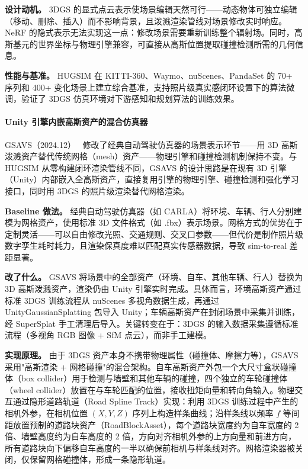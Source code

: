 \textbf{设计动机。} 3DGS 的显式点云表示使场景编辑天然可行——动态物体可独立编辑（移动、删除、插入）而不影响背景，且泼溅渲染管线对场景修改实时响应。NeRF 的隐式表示无法实现这一点：修改场景需要重新训练整个辐射场。同时，高斯基元的世界坐标与物理引擎兼容，可直接从高斯位置提取碰撞检测所需的几何信息。

\textbf{性能与基准。} HUGSIM 在 KITTI-360、Waymo、nuScenes、PandaSet 的 70+ 序列和 400+ 变化场景上建立综合基准，支持照片级真实感闭环设置下的算法微调，验证了 3DGS 仿真环境对下游感知和规划算法的训练效果。

\paragraph{Unity 引擎内嵌高斯资产的混合仿真器}

GSAVS（2024.12）~\cite{2412_18816} 修改了经典自动驾驶仿真器的场景表示环节——用 3D 高斯泼溅资产替代传统网格（mesh）资产——物理引擎和碰撞检测机制保持不变。与 HUGSIM 从零构建闭环渲染管线不同，GSAVS 的设计思路是在现有 3D 引擎（Unity）内部嵌入全高斯资产，直接复用引擎的物理引擎、碰撞检测和强化学习接口，同时用 3DGS 的照片级渲染替代网格渲染。

\textbf{Baseline 做法。} 经典自动驾驶仿真器（如 CARLA）将环境、车辆、行人分别建模为网格资产，使用标准 3D 文件格式（如 .fbx）表示场景。网格方式的优势在于定制灵活——可以自由修改光照、交通规则、交叉口参数——但代价是制作照片级数字孪生耗时耗力，且渲染保真度难以匹配真实传感器数据，导致 sim-to-real 差距显著。

\textbf{改了什么。} GSAVS 将场景中的全部资产（环境、自车、其他车辆、行人）替换为 3D 高斯泼溅资产，渲染仍由 Unity 引擎实时完成。具体而言，环境高斯资产通过标准 3DGS 训练流程从 nuScenes 多视角数据生成，再通过 UnityGaussianSplatting 包导入 Unity；车辆高斯资产在封闭场景中采集并训练，经 SuperSplat 手工清理后导入。关键转变在于：3DGS 的输入数据采集遵循标准流程（多视角 RGB 图像 + SfM 点云），而非手工建模。

\textbf{实现原理。} 由于 3DGS 资产本身不携带物理属性（碰撞体、摩擦力等），GSAVS 采用"高斯渲染 + 网格碰撞"的混合架构。自车高斯资产外包一个大尺寸盒状碰撞体（box collider）用于检测与墙壁和其他车辆的碰撞，四个独立的车轮碰撞体（wheel collider）放置在与车轮匹配的位置，接收扭矩向量和转向角输入。物理交互通过隐形道路轨道（Road Spline Track）实现：利用 3DGS 训练过程中产生的相机外参，在相机位置 $(X, Y, Z)$ 序列上构造样条曲线；沿样条线以频率 $f$ 等间距放置预制的道路块资产（RoadBlockAsset），每个道路块宽度约为自车宽度的 2 倍、墙壁高度约为自车高度的 2 倍，方向对齐相机外参的上方向量和前进方向，所有道路块向下偏移自车高度的一半以确保前相机与样条线对齐。网格渲染器被关闭，仅保留网格碰撞体，形成一条隐形轨道。

